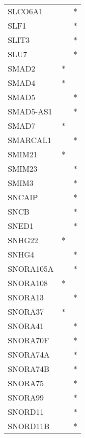 \begin{longtable}{lcc}
SLCO6A1         &                &          * \\
SLF1            &                &          * \\
SLIT3           &                &          * \\
SLU7            &                &          * \\
SMAD2           &              * &            \\
SMAD4           &              * &            \\
SMAD5           &                &          * \\
SMAD5-AS1       &                &          * \\
SMAD7           &              * &            \\
SMARCAL1        &                &          * \\
SMIM21          &              * &            \\
SMIM23          &                &          * \\
SMIM3           &                &          * \\
SNCAIP          &                &          * \\
SNCB            &                &          * \\
SNED1           &                &          * \\
SNHG22          &              * &            \\
SNHG4           &                &          * \\
SNORA105A       &                &          * \\
SNORA108        &              * &            \\
SNORA13         &                &          * \\
SNORA37         &              * &            \\
SNORA41         &                &          * \\
SNORA70F        &                &          * \\
SNORA74A        &                &          * \\
SNORA74B        &                &          * \\
SNORA75         &                &          * \\
SNORA99         &                &          * \\
SNORD11         &                &          * \\
SNORD11B        &                &          * \\

\end{longtable}
